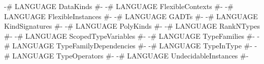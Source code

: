 \begin{code}
{-# LANGUAGE DataKinds              #-}
{-# LANGUAGE FlexibleContexts       #-}
{-# LANGUAGE FlexibleInstances      #-}
{-# LANGUAGE GADTs                  #-}
{-# LANGUAGE KindSignatures         #-}
{-# LANGUAGE PolyKinds              #-}
{-# LANGUAGE RankNTypes             #-}
{-# LANGUAGE ScopedTypeVariables    #-}
{-# LANGUAGE TypeFamilies           #-}
{-# LANGUAGE TypeFamilyDependencies #-}
{-# LANGUAGE TypeInType             #-}
{-# LANGUAGE TypeOperators          #-}
{-# LANGUAGE UndecidableInstances   #-}
\end{code}
